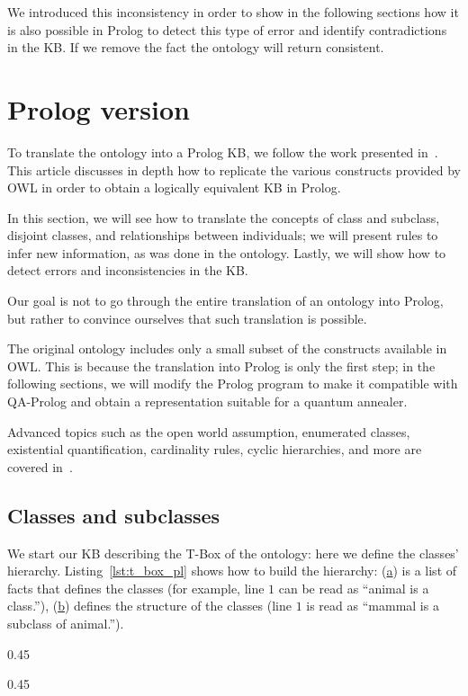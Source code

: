 We introduced this inconsistency in order to show \textemdash{}in the following sections\textemdash{} how it is also possible in Prolog to detect this type of error and identify contradictions in the KB. If we remove the fact  the ontology will return consistent.

\section{Prolog version}
To translate the ontology into a Prolog KB, we follow the work presented in~\cite{samuel2008translating}. This article discusses in depth how to replicate the various constructs provided by OWL in order to obtain a logically equivalent KB in Prolog.

In this section, we will see how to translate the concepts of class and subclass, disjoint classes, and relationships between individuals; we will present rules to infer new information, as was done in the ontology. Lastly, we will show how to detect errors and inconsistencies in the KB.

Our goal is not to go through the entire translation of an ontology into Prolog, but rather to convince ourselves that such translation is possible.

The original ontology includes only a small subset of the constructs available in OWL. This is because the translation into Prolog is only the first step; in the following sections, we will modify the Prolog program to make it compatible with QA-Prolog and obtain a representation suitable for a quantum annealer.

Advanced topics such as the open world assumption, enumerated classes, existential quantification, cardinality rules, cyclic hierarchies, and  more are covered in~\cite{samuel2008translating}.

\subsection{Classes and subclasses}
We start our KB describing the T-Box of the ontology: here we define the classes' hierarchy. Listing~\ref{lst:t_box_pl} shows how to build the hierarchy: (\hyperref[lst:t_box_pl_class]{a}) is a list of facts that defines the classes (for example, line $1$ can be read as “animal is a class.”), (\hyperref[lst:t_box_pl_subclass]{b}) defines the structure of the classes (line $1$ is read as “mammal is a subclass of animal.”).

\begin{listing}[h]
	\centering
	\begin{sublisting}[c]{0.45\linewidth}
		\caption{Classes definitions}
		\label{lst:t_box_pl_class}
	\end{sublisting}
	\qquad
	\begin{sublisting}[c]{0.45\linewidth}
		\caption{Subclasses definitions}
		\label{lst:t_box_pl_subclass}
	\end{sublisting}
	\caption{T-Box definition}
	\label{lst:t_box_pl}
\end{listing}

